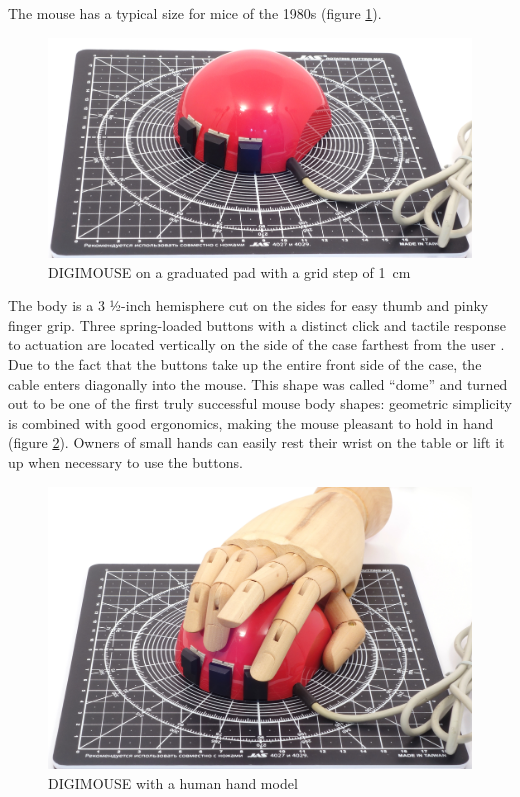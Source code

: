 \documentclass[11pt, a4paper]{article}
\begin{document}
The mouse has a typical size for mice of the 1980s (figure \ref{fig:DIGIMOUSEP4Size}).

\begin{figure}[h]
    \centering
    \includegraphics[scale=0.5]{1982_depraz_digimouse/size_30.jpg}
    \caption{DIGIMOUSE on a graduated pad with a grid step of 1~cm}
    \label{fig:DIGIMOUSEP4Size}
\end{figure}

The body is a 3 ½-inch hemisphere cut on the sides for easy thumb and pinky finger grip. Three spring-loaded buttons with a distinct click and tactile response to actuation are located vertically on the side of the case farthest from the user \cite{oldmouse}. Due to the fact that the buttons take up the entire front side of the case, the cable enters diagonally into the mouse. This shape was called ``dome'' and turned out to be one of the first truly successful mouse body shapes: geometric simplicity is combined with good ergonomics, making the mouse pleasant to hold in hand (figure \ref{fig:DIGIMOUSEP4Hand}). Owners of small hands can easily rest their wrist on the table or lift it up when necessary to use the buttons.

\begin{figure}[h]
    \centering
    \includegraphics[scale=0.5]{1982_depraz_digimouse/hand_30.jpg}
    \caption{DIGIMOUSE with a human hand model}
    \label{fig:DIGIMOUSEP4Hand}
\end{figure}
\end{document}
